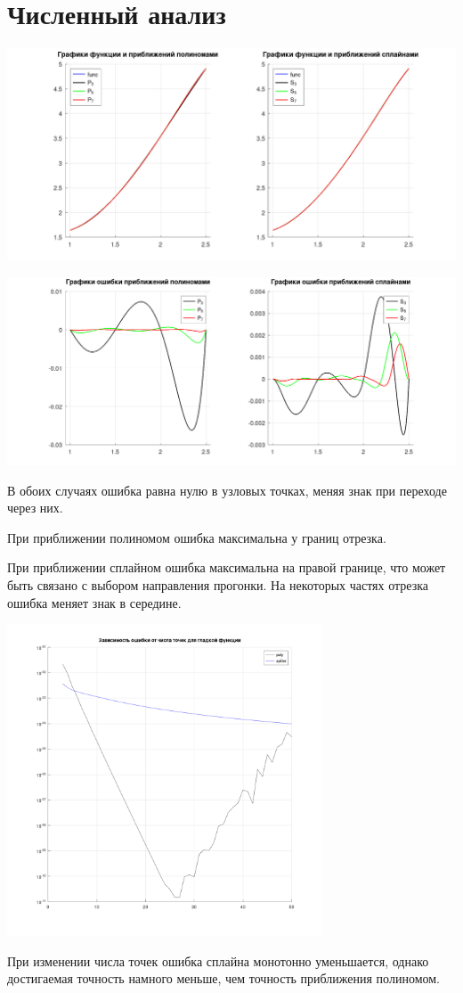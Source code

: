 \documentclass[a4paper]{article}
\begin{document}
\section{Численный анализ}\label{sec:numAn}
\begin{center}
\includegraphics[width=\textwidth]{compGraph.png}
\end{center}
\begin{center}
\includegraphics[width=\textwidth]{compErr.png}
\end{center}

В обоих случаях ошибка равна нулю в узловых точках, меняя знак при переходе через них.

При приближении полиномом ошибка максимальна у границ отрезка.

При приближении сплайном ошибка максимальна на правой границе, что может быть связано с выбором направления прогонки. На
некоторых частях отрезка ошибка меняет знак в середине.

\begin{center}
\includegraphics[width=0.7\textwidth]{err(n).png}
\end{center}
При изменении числа точек ошибка сплайна монотонно уменьшается, однако достигаемая точность намного меньше, чем точность
приближения полиномом.
\end{document}
